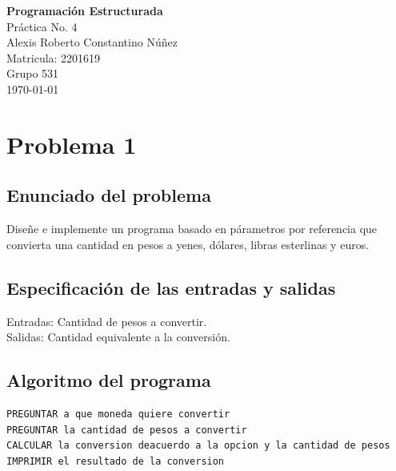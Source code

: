 \documentclass[12pt]{article}
\begin{document}
\begin{titlepage}
    \centering
    \vspace*{4cm}
    
    {\Large \textbf{Programación Estructurada}}\\[1cm]
    {\large Práctica No. 4}\\[2cm]
    
    {\large Alexis Roberto Constantino Núñez}\\

    {\large Matricula: 2201619}\\
    {\large Grupo 531}\\[1cm]
    
    {\large \today}
\end{titlepage}

\section{Problema 1}

\subsection{Enunciado del problema}
Dise\~{n}e e implemente un programa basado en p\'{a}rametros por referencia que convierta una cantidad en pesos a yenes, d\'{o}lares, libras esterlinas y euros.
\subsection{Especificación de las entradas y salidas}
Entradas: Cantidad de pesos a convertir.\\
Salidas: Cantidad equivalente a la conversi\'{o}n.
\subsection{Algoritmo del programa}
\begin{verbatim}
PREGUNTAR a que moneda quiere convertir
PREGUNTAR la cantidad de pesos a convertir
CALCULAR la conversion deacuerdo a la opcion y la cantidad de pesos
IMPRIMIR el resultado de la conversion
\end{verbatim}
\end{document}
